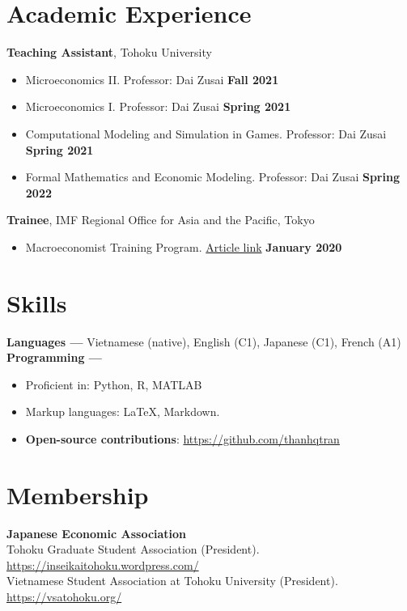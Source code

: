 \documentclass[margin,line]{res}
\begin{document}
\begin{resume}
\vspace{-1em}

\section{\sc Academic Experience}
{\bf Teaching Assistant}, Tohoku University
\vspace*{.05in}
\begin{itemize}
\item[ ] Microeconomics II. Professor: Dai Zusai \hfill {\bf Fall 2021}
\item[ ] Microeconomics I. Professor: Dai Zusai \hfill {\bf Spring 2021}
\item[ ] Computational Modeling and Simulation in Games. Professor: Dai Zusai \hfill {\bf Spring 2021}
\item[ ] Formal Mathematics and Economic Modeling. Professor: Dai Zusai \hfill {\bf Spring 2022}
\end{itemize}

{\bf Trainee}, IMF Regional Office for Asia and the Pacific, Tokyo
\vspace*{.05in}
\begin{itemize}
\item[ ] Macroeconomist Training Program. \href{https://www.imf.org/en/Countries/ResRep/OAP-Home/~/link.aspx?_id=C2F64E8412B64A86BD37DDEB8439312B&_z=z}{Article link} \hfill {\bf January 2020}
\end{itemize}


\section{\sc Skills}
{\bf Languages ---}
\vspace*{.05in}
Vietnamese (native), English (C1), Japanese (C1), French (A1)\\
{\bf Programming ---}
\vspace*{.05in}
\begin{itemize}
	\item Proficient in: Python, R, MATLAB
	\item Markup languages: \LaTeX, Markdown.
	\item {\bf Open-source contributions}: \url{https://github.com/thanhqtran}
\end{itemize}

\vspace{-1em}


\section{\sc Membership}
{\bf Japanese Economic Association} \\
Tohoku Graduate Student Association (President). \url{https://inseikaitohoku.wordpress.com/} \\
Vietnamese Student Association at Tohoku University (President). \url{https://vsatohoku.org/}


\end{resume}
\end{document}
